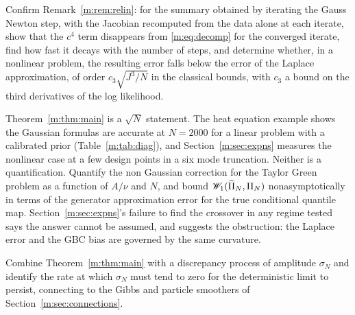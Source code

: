 \begin{openquestion}\label{m:op:relin}%
Confirm Remark~\ref{m:rem:relin}: for the summary obtained by iterating the Gauss Newton step, with the Jacobian recomputed from the data alone at each iterate, show that the $c^4$ term disappears from \eqref{m:eq:decomp} for the converged iterate, find how fast it decays with the number of steps, and determine whether, in a nonlinear problem, the resulting error falls below the error of the Laplace approximation, of order $c_3\sqrt{J^3/N}$ in the classical bounds, with $c_3$ a bound on the third derivatives of the log likelihood.
\end{openquestion}

\begin{openquestion}[Finite $N$]\label{m:op:finiten}%
Theorem~\ref{m:thm:main} is a $\sqrt N$ statement. The heat equation example shows the Gaussian formulas are accurate at $N=2000$ for a linear problem with a calibrated prior (Table~\ref{m:tab:diag}), and Section~\ref{m:sec:expns} measures the nonlinear case at a few design points in a six mode truncation. Neither is a quantification. Quantify the non Gaussian correction for the Taylor Green problem as a function of $A/\nu$ and $N$, and bound $\mathscr{W}_1(\widehat\Pi_N,\Pi_N)$ nonasymptotically in terms of the generator approximation error for the true conditional quantile map. Section~\ref{m:sec:expns}'s failure to find the crossover in any regime tested says the answer cannot be assumed, and suggests the obstruction: the Laplace error and the GBC bias are governed by the same curvature.
\end{openquestion}

\begin{openquestion}\label{m:op:modelerror}%
Combine Theorem~\ref{m:thm:main} with a discrepancy process of amplitude $\sigma_N$ and identify the rate at which $\sigma_N$ must tend to zero for the deterministic limit to persist, connecting to the Gibbs and particle smoothers of Section~\ref{m:sec:connections}.
\end{openquestion}